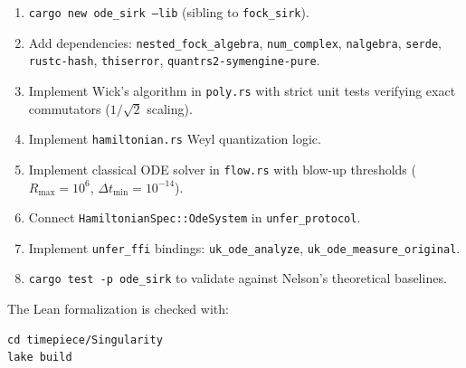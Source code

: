 \documentclass[11pt,a4paper]{article}
\begin{document}
\begin{enumerate}
  \item \texttt{cargo new ode\_sirk --lib} (sibling to
    \texttt{fock\_sirk}).
  \item Add dependencies: \texttt{nested\_fock\_algebra},
    \texttt{num\_complex}, \texttt{nalgebra}, \texttt{serde},
    \texttt{rustc-hash}, \texttt{thiserror},
    \texttt{quantrs2-symengine-pure}.
  \item Implement Wick's algorithm in \texttt{poly.rs} with strict unit
    tests verifying exact commutators ($1/\sqrt{2}$ scaling).
  \item Implement \texttt{hamiltonian.rs} Weyl quantization logic.
  \item Implement classical ODE solver in \texttt{flow.rs} with blow-up
    thresholds ($R_{\max}=10^{6}$, $\Delta t_{\min}=10^{-14}$).
  \item Connect \texttt{HamiltonianSpec::OdeSystem} in
    \texttt{unfer\_protocol}.
  \item Implement \texttt{unfer\_ffi} bindings:
    \texttt{uk\_ode\_analyze}, \texttt{uk\_ode\_measure\_original}.
  \item \texttt{cargo test -p ode\_sirk} to validate against Nelson's
    theoretical baselines.
\end{enumerate}

The Lean formalization is checked with:
\begin{lstlisting}[language={},caption={Lean~4 build}]
cd timepiece/Singularity
lake build
\end{lstlisting}
\end{document}
